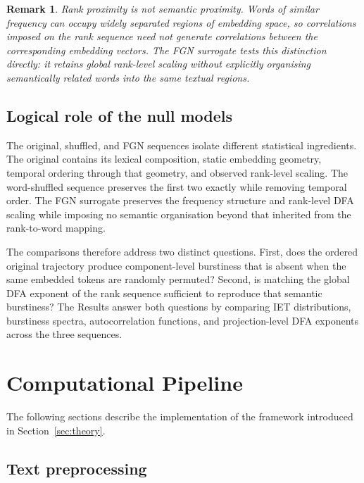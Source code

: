 \documentclass[12pt,a4paper]{article}
\newtheorem{remark}{Remark}
\begin{document}
\begin{remark}
\label{rem:fgn_entropy}
  Rank proximity is not semantic proximity.
  Words of similar frequency can occupy widely separated regions of
  embedding space, so correlations imposed on the rank sequence need
  not generate correlations between the corresponding embedding
  vectors.
  The FGN surrogate tests this distinction directly: it retains global
  rank-level scaling without explicitly organising semantically related
  words into the same textual regions.
\end{remark}

\subsection{Logical role of the null models}
\label{sec:taxonomy}

The original, shuffled, and FGN sequences isolate different statistical
ingredients.
The original contains its lexical composition, static embedding
geometry, temporal ordering through that geometry, and observed
rank-level scaling.
The word-shuffled sequence preserves the first two exactly while
removing temporal order.
The FGN surrogate preserves the frequency structure and rank-level DFA
scaling while imposing no semantic organisation beyond that inherited
from the rank-to-word mapping.

The comparisons therefore address two distinct questions.
First, does the ordered original trajectory produce component-level
burstiness that is absent when the same embedded tokens are randomly
permuted?
Second, is matching the global DFA exponent of the rank sequence
sufficient to reproduce that semantic burstiness?
The Results answer both questions by comparing IET distributions,
burstiness spectra, autocorrelation functions, and projection-level DFA
exponents across the three sequences.


\section{Computational Pipeline}
\label{sec:pipeline}

The following sections describe the implementation of the framework
introduced in Section~\ref{sec:theory}.

\subsection{Text preprocessing}
\label{sec:preprocessing}
\label{sec:filtering_results}
\end{document}
